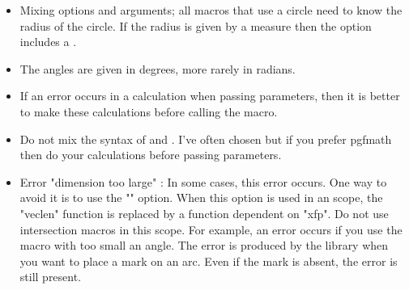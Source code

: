 \begin{itemize}
\item Mixing options and arguments; all macros that use a circle need to know the radius of the circle. If the radius is given by a measure then the option includes a .  


\item The angles are given in degrees, more rarely in radians.  

\item If an error occurs in a calculation when passing parameters, then it is better to make these calculations before calling the macro.
 
\item Do not mix the syntax of  and . I've often chosen  but if you prefer pgfmath then do your calculations before passing parameters.
  
 \item  Error "dimension too large"  : In some cases, this error occurs. One way to avoid it is to use the "" option. When this option is used in an scope, the "veclen" function is replaced by a function dependent on "xfp".  Do not use intersection macros in this scope. For example, an error occurs if you use the macro 
 with too small an angle. The error is produced by the  library when you want to place a mark on an arc. Even if the mark is absent, the error is still present.

\end{itemize}    
\endinput
